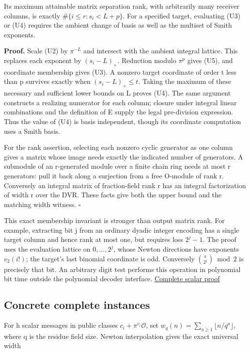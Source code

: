 \documentclass[
  11pt,
]{article}
\begin{document}
Its maximum attainable matrix separation rank, with arbitrarily many
receiver columns, is exactly \(\#\{i\le r:s_i<L+p\}\). For a specified
target, evaluating (U3) or (U4) requires the ambient change of basis as
well as the multiset of Smith exponents.

\textbf{Proof.} Scale (U2) by \(\pi^{-L}\) and intersect with the
ambient integral lattice. This replaces each exponent by \((s_i-L)_+\).
Reduction modulo \(\pi^p\) gives (U5), and coordinate membership gives
(U3). A nonzero target coordinate of order t less than p survives
exactly when \((s_i-L)_+\le t\). Taking the maximum of these necessary
and sufficient lower bounds on L proves (U4). The same argument
constructs a realizing numerator for each column; closure under integral
linear combinations and the definition of E supply the legal
pre-division expression. Thus the value of (U4) is basis independent,
though its coordinate computation uses a Smith basis.

For the rank assertion, selecting each nonzero cyclic generator as one
column gives a matrix whose image needs exactly the indicated number of
generators. A submodule of an r-generated module over a finite chain
ring needs at most r generators: pull it back along a surjection from a
free O-module of rank r. Conversely an integral matrix of fraction-field
rank r has an integral factorization of width r over the DVR. These
facts give both the upper bound and the matching width witness.
\(\square\)

This exact membership invariant is stronger than output matrix rank. For
example, extracting bit j from an ordinary dyadic integer encoding has a
single target column and hence rank at most one, but requires loss
\(2^j-1\). The proof uses the evaluation lattice on \(0,\ldots,2^j\),
whose Newton directions have exponents \(v_2(i!)\); the target's last
binomial coordinate is odd. Conversely \(\binom{x}{2^j}\bmod2\) is
precisely that bit. An arbitrary digit test performs this operation in
polynomial bit time outside the polynomial decoder interface.
\hyperref[v8-section-nonlinear-budget]{Complete scalar proof}

\subsection{Concrete complete
instances}\label{v8-concrete-complete-instances}

For h scalar messages in public classes \(c_i+\pi^{v_i}\mathcal O\), set
\(w_q(n)=\sum_{a\ge1}\lfloor n/q^a\rfloor\), where q is the residue
field size. Newton interpolation gives the exact universal width
\end{document}

